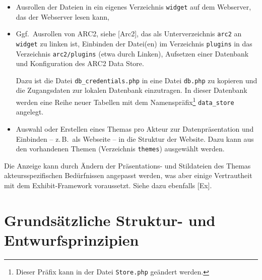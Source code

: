 \documentclass[11pt,a4paper]{article}
\begin{document}
\begin{itemize}
\item Ausrollen der Dateien in ein eigenes Verzeichnis \texttt{widget} auf dem
  Webserver, das der Webserver lesen kann,
\item Ggf.\ Ausrollen von ARC2, siehe [Arc2], das als Unterverzeichnis
  \texttt{arc2} an \texttt{widget} zu linken ist, Einbinden der Datei(en) im
  Verzeichnis \texttt{plugins} in das Verzeichnis \texttt{arc2/plugins} (etwa
  durch Linken), Aufsetzen einer Datenbank und Konfiguration des ARC2 Data
  Store.

  Dazu ist die Datei \texttt{db\_credentials.php} in eine Datei
  \texttt{db.php} zu kopieren und die Zugangsdaten zur lokalen Datenbank
  einzutragen. In dieser Datenbank werden eine Reihe neuer Tabellen mit dem
  Namenspräfix\footnote{Dieser Präfix kann in der Datei \texttt{Store.php}
    geändert werden.} \texttt{data\_store} angelegt.
\item Auswahl oder Erstellen eines Themas pro Akteur zur Datenpräsentation und
  Einbinden -- z.\,B.\ als Webseite -- in die Struktur der Website.  Dazu kann
  aus den vorhandenen Themen (Verzeichnis \texttt{themes}) ausgewählt werden. 
\end{itemize}
Die Anzeige kann durch Ändern der Präsentations- und Stildateien des Themas
akteurs\-spezifischen Bedürfnissen angepasst werden, was aber einige
Vertrautheit mit dem Exhibit-Framework voraussetzt.  Siehe dazu ebenfalls
[Ex].

\section{Grundsätzliche Struktur- und Entwurfsprinzipien}
\end{document}

